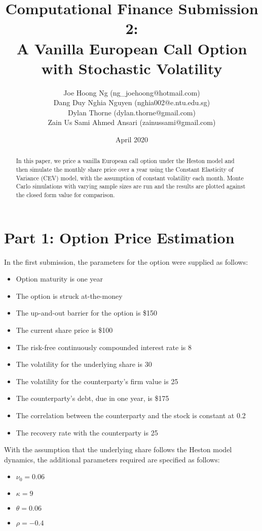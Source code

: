 \documentclass{article}
\title{Computational Finance Submission 2: \\A Vanilla European Call Option with Stochastic Volatility}
\author{Joe Hoong Ng (ng\_joehoong@hotmail.com)
\\Dang Duy Nghia Nguyen (nghia002@e.ntu.edu.sg)
\\Dylan Thorne (dylan.thorne@gmail.com)
\\Zain Us Sami Ahmed Ansari (zainussami@gmail.com)}
\date{April 2020}
\begin{document}
\maketitle

\begin{abstract}
    In this paper, we price a vanilla European call option under the Heston model and then simulate the monthly share price over a year using the Constant Elasticity of Variance (CEV) model, with the assumption of constant volatility each month. Monte Carlo simulations with varying sample sizes are run and the results are plotted against the closed form value for comparison.
\end{abstract}

\section{Part 1: Option Price Estimation}

In the first submission, the parameters for the option were supplied as follows:
\begin{itemize}
    \item Option maturity is one year
    \item The option is struck at-the-money
    \item The up-and-out barrier for the option is \$150
    \item The current share price is \$100
    \item The risk-free continuously compounded interest rate is 8%
    \item The volatility for the underlying share is 30%
    \item The volatility for the counterparty’s firm value is 25%
    \item The counterparty’s debt, due in one year, is \$175
    \item The correlation between the counterparty and the stock is constant at 0.2
    \item The recovery rate with the counterparty is 25%
\end{itemize}

With the assumption that the underlying share follows the Heston model dynamics, the additional parameters required are specified as follows:
\begin{itemize}
    \item $\nu_0 = 0.06$
    \item $\kappa = 9$
    \item $\theta = 0.06$
    \item $\rho = −0.4$
\end{itemize}
\end{document}
